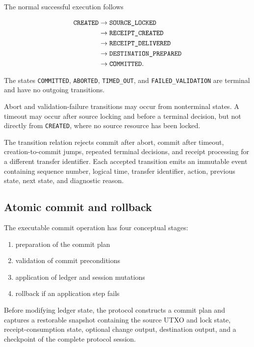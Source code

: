 The normal successful execution follows

\begin{equation}
\begin{split}
\texttt{CREATED}
&\rightarrow \texttt{SOURCE\_\allowbreak LOCKED} \\
&\rightarrow \texttt{RECEIPT\_\allowbreak CREATED} \\
&\rightarrow \texttt{RECEIPT\_\allowbreak DELIVERED} \\
&\rightarrow \texttt{DESTINATION\_\allowbreak PREPARED} \\
&\rightarrow \texttt{COMMITTED}.
\end{split}
\label{eq:normal-commit-path}
\end{equation}

The states \texttt{COMMITTED}, \texttt{ABORTED}, \texttt{TIMED\_\allowbreak OUT},
and \texttt{FAILED\_\allowbreak VALIDATION} are terminal and have no outgoing
transitions.

Abort and validation-failure transitions may occur from nonterminal states. A
timeout may occur after source locking and before a terminal decision, but not
directly from \texttt{CREATED}, where no source resource has been locked.

The transition relation rejects commit after abort, commit after timeout,
creation-to-commit jumps, repeated terminal decisions, and receipt processing
for a different transfer identifier. Each accepted transition emits an
immutable event containing sequence number, logical time, transfer identifier,
action, previous state, next state, and diagnostic reason.

\subsection{Atomic commit and rollback}
\label{subsec:atomic-commit}

The executable commit operation has four conceptual stages:

\begin{enumerate}
\item preparation of the commit plan
\item validation of commit preconditions
\item application of ledger and session mutations
\item rollback if an application step fails
\end{enumerate}

Before modifying ledger state, the protocol constructs a commit plan and
captures a restorable snapshot containing the source UTXO and lock state,
receipt-consumption state, optional change output, destination output, and a
checkpoint of the complete protocol session.

